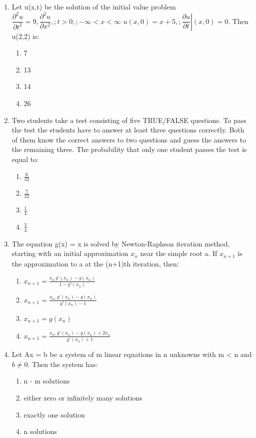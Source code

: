 \documentclass[journal,cmex10]{IEEEtran}
\theoremstyle{remark}
\numberwithin{equation}{enumi}
\numberwithin{figure}{enumi}
\begin{document}
\begin{enumerate}[label=\arabic*)]
    \item Let u(x,t) be the solution of the initial value problem $ \dfrac{\partial^{2}u}{\partial t^{2}} = 9,\dfrac{\partial^{2}u}{\partial x^{2}},; t>0,; -\infty<x<\infty $
$ u(x,0)=x+5,; \left.\dfrac{\partial u}{\partial t}\right|(x,0)=0 $. Then u(2,2) is:
    \bigskip
    \hfill {}
    \begin{enumerate}[label=\alph*)]
        \item 7
        \item 13
        \item 14
        \item 26
    \end{enumerate}
    \bigskip

    \item Two students take a test consisting of five TRUE/FALSE questions. To pass the test the students have to answer at least three questions correctly. Both of them know the correct answers to two questions and guess the answers to the remaining three. The probability that only one student passes the test is equal to:
    \bigskip
    \hfill {}
    \begin{enumerate}[label=\alph*)]
        \item $\frac{6}{32}$
        \item $\frac{7}{32}$
        \item $\frac{1}{4}$
        \item $\frac{3}{4}$
    \end{enumerate}
    \bigskip

    \item The equation g(x) = x is solved by Newton-Raphson iteration method, starting with an initial approximation $x_n$ near the simple root a. If $x_{n+1}$ is the approximation to a at the (n+1)th iteration, then:
    \bigskip
    \hfill {}
    \begin{enumerate}[label=\alph*)]
        \item $ x_{n+1}=\frac{x_n\,g'(x_n)-g(x_n)}{1-g'(x_n)} $
        \item $ x_{n+1}=\frac{x_n,g'(x_n)-g(x_n)}{g'(x_n)-1} $
        \item $ x_{n+1}=g(x_n) $
        \item $ x_{n+1}=\frac{x_n,g'(x_n)-g(x_n)+2x_n}{g'(x_n)+1} $
    \end{enumerate}
    \bigskip

    \item Let Ax = b be a system of m linear equations in n unknowns with m < n and $b \neq 0$. Then the system has:
    \bigskip
    \hfill {}
    \begin{enumerate}[label=\alph*)]
        \item n - m  solutions
        \item either zero or infinitely many solutions
        \item exactly one solution
        \item n  solutions
    \end{enumerate}
    \bigskip


\end{enumerate}
\end{document}
